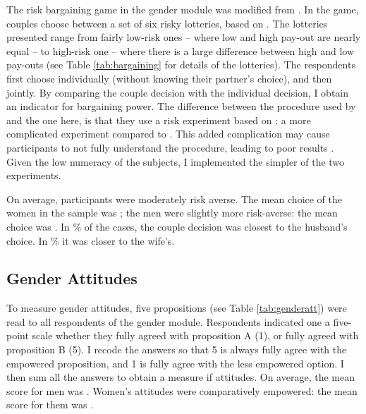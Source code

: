 \documentclass[10pt,a4paper]{scrartcl} %
\begin{document}
The risk bargaining game in the gender module was modified from \cite{Martinsson2009}. In the game, couples choose between a set of six risky lotteries, based on \cite{Eckel2002}. The lotteries presented range from fairly low-risk ones -- where low and high pay-out are nearly equal -- to high-risk one -- where there is a large difference between high and low pay-outs (see Table \ref{tab:bargaining} for details of the lotteries). The respondents first choose individually (without knowing their partner's choice), and then jointly. By comparing the couple decision with the individual decision, I obtain an indicator for bargaining power. The difference between the procedure used by \cite{Martinsson2009} and the one here, is that they use a risk experiment based on \cite{Holt2002}; a more complicated experiment compared to \citeauthor{Eckel2002}. This added complication may cause participants to not fully understand the procedure, leading to poor results \citep{Dave2010a}. Given the low numeracy of the subjects, I implemented the simpler of the two experiments.

On average, participants were moderately risk averse. The mean choice of the women in the sample was ; the men were slightly more risk-averse:  the mean choice was . In \% of the cases, the couple decision was closest to the husband's choice. In \% it was closer to the wife's.


\subsection*{Gender Attitudes}
 To measure gender attitudes, five propositions (see Table \ref{tab:genderatt}) were read to all respondents of the gender module. Respondents indicated one a five-point scale whether they fully agreed with proposition A (1), or fully agreed with proposition B (5). I recode the answers so that 5 is always fully agree with the empowered proposition, and 1 is fully agree with the less empowered option. I then sum all the answers to obtain a measure if attitudes. On average, the mean score for men was  . Women's attitudes were comparatively empowered: the mean score for them was .
\end{document}
